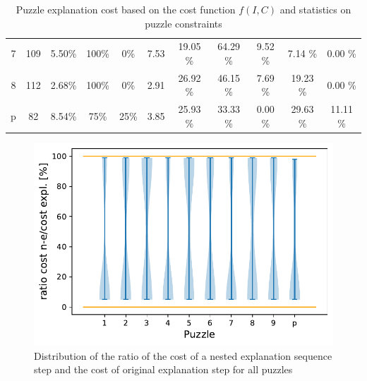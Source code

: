 \begin{table}
\begin{tabular}{c|cc|cc|c|ccccc}
		7          & 109                & 5.50\%             & 100\%                                              & 0\%                   & 7.53                                                                   & 19.05 \%      & 64.29 \%        & 9.52 \%       & 7.14 \%            & 0.00 \%      \\
		8          & 112                & 2.68\%             & 100\%                                              & 0\%                   & 2.91                                                                   & 26.92 \%      & 46.15 \%        & 7.69 \%       & 19.23 \%           & 0.00 \%      \\
		p          & 82                 & 8.54\%             & 75\%                                               & 25\%                  & 3.85                                                                   & 25.93 \%      & 33.33 \%        & 0.00 \%       & 29.63 \%           & 11.11 \%
	\end{tabular}
	\caption{Puzzle explanation cost based on the cost function $f(I, C)$ and statistics on puzzle constraints}

	\label{table:nested_explanation}

\end{table}


\begin{figure}[]
	\centering
	\includegraphics[width=.7\textwidth]{figures/violin_plot.pdf}
	\caption{Distribution of the ratio of the cost of a nested explanation sequence step and the cost of original explanation step for all puzzles}
	\label{fig:experiments:violin}
\end{figure}


